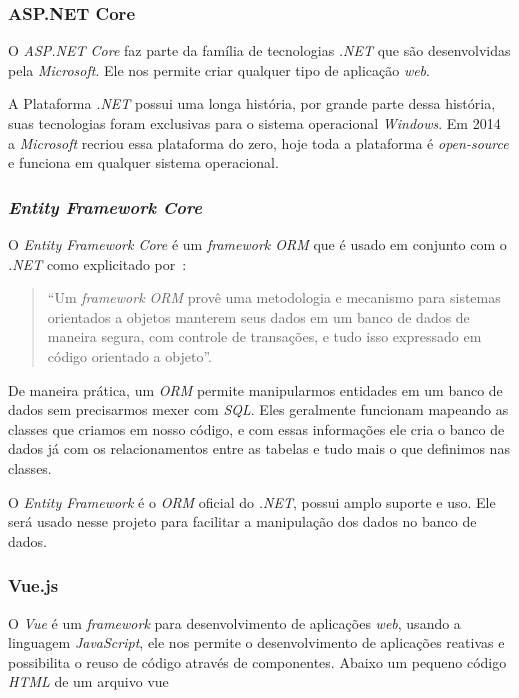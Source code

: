 \documentclass[12pt]{article}
\begin{document}
\subsubsection{ASP.NET Core}

O \textit{ASP.NET Core} faz parte da família de tecnologias \textit{.NET} que são desenvolvidas pela \textit{Microsoft}.
Ele nos permite criar qualquer tipo de aplicação \textit{web}.

A Plataforma \textit{.NET} possui uma longa história, por grande parte dessa história, suas
tecnologias foram exclusivas para o sistema operacional \textit{Windows}. Em 2014 a \textit{Microsoft} recriou
essa plataforma do zero, hoje toda a plataforma é \textit{open-source} e funciona em qualquer
sistema operacional.

\subsubsection{\textit{Entity Framework Core}}

O \textit{Entity Framework Core} é um \textit{framework ORM} que é usado em conjunto com o \textit{.NET}
como explicitado por~\cite{ormHibernate}:

\begin{quote}
  ``Um \textit{framework ORM} provê uma metodologia e mecanismo
  para sistemas orientados a objetos manterem seus dados em um banco de dados de maneira
  segura, com controle de transações, e tudo isso expressado em código orientado a objeto''.
\end{quote}

De maneira prática, um \textit{ORM} permite manipularmos entidades em um banco de dados
sem precisarmos mexer com \textit{SQL}. Eles geralmente funcionam mapeando as classes
que criamos em nosso código, e com essas informações ele cria o banco de dados já com os relacionamentos
entre as tabelas e tudo mais o que definimos nas classes.

O \textit{Entity Framework} é o \textit{ORM} oficial do \textit{.NET}, possui amplo suporte e uso. Ele será
usado nesse projeto para facilitar a manipulação dos dados no banco de dados.

\subsubsection{Vue.js}

O \textit{Vue} é um \textit{framework} para desenvolvimento de aplicações \textit{web}, usando a linguagem \textit{JavaScript},
ele nos permite o desenvolvimento de aplicações reativas e possibilita o reuso
de código através de componentes. Abaixo um pequeno código \textit{HTML} de um arquivo vue
\end{document}

